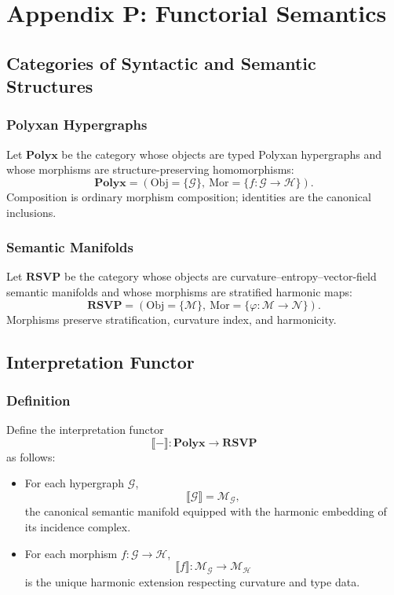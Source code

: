 \chapter*{Appendix P: Functorial Semantics}

\section{Categories of Syntactic and Semantic Structures}

\subsection{Polyxan Hypergraphs}

Let $\mathbf{Polyx}$ be the category whose objects are typed Polyxan hypergraphs and whose morphisms are structure-preserving homomorphisms:
\[
\mathbf{Polyx}
=
\left(
\mathrm{Obj}=\{\mathcal{G}\},\ 
\mathrm{Mor}=\{f:\mathcal{G}\to\mathcal{H}\}
\right).
\]
Composition is ordinary morphism composition; identities are the canonical inclusions.

\subsection{Semantic Manifolds}

Let $\mathbf{RSVP}$ be the category whose objects are curvature–entropy–vector-field semantic manifolds and whose morphisms are stratified harmonic maps:
\[
\mathbf{RSVP}
=
\left(
\mathrm{Obj}=\{\mathcal{M}\},\ 
\mathrm{Mor}=\{\varphi:\mathcal{M}\to\mathcal{N}\}
\right).
\]
Morphisms preserve stratification, curvature index, and harmonicity.

\section{Interpretation Functor}

\subsection{Definition}

Define the interpretation functor
\[
\llbracket - \rrbracket : \mathbf{Polyx} \longrightarrow \mathbf{RSVP}
\]
as follows:
\begin{itemize}
\item For each hypergraph $\mathcal{G}$,  
  \[
  \llbracket \mathcal{G} \rrbracket
  = 
  \mathcal{M}_{\mathcal{G}},
  \]
  the canonical semantic manifold equipped with the harmonic embedding of its incidence complex.
\item For each morphism $f:\mathcal{G}\to\mathcal{H}$,  
  \[
  \llbracket f \rrbracket:\mathcal{M}_{\mathcal{G}}\to\mathcal{M}_{\mathcal{H}}
  \]
  is the unique harmonic extension respecting curvature and type data.
\end{itemize}


